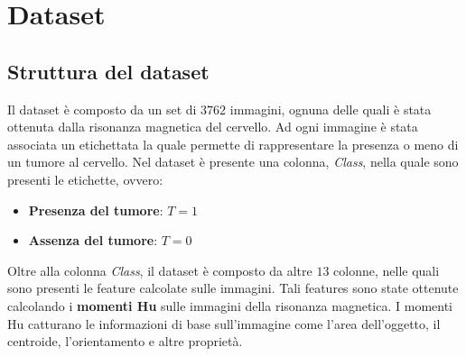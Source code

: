\chapter{Dataset}
\section{Struttura del dataset}
Il dataset è composto da un set di $3762$ immagini, ognuna delle quali è stata
ottenuta dalla risonanza magnetica del cervello. Ad ogni immagine è stata
associata un etichettata la quale permette di rappresentare la presenza o meno
di un tumore al cervello. Nel dataset è presente una colonna, \textit{Class},
nella quale sono presenti le etichette, ovvero:
\begin{itemize}
      \item \textbf{Presenza del tumore}: $T = 1$
      \item \textbf{Assenza del tumore}: $T = 0$
\end{itemize}

Oltre alla colonna \textit{Class}, il dataset è composto da altre $13$ colonne,
nelle quali sono presenti le feature calcolate sulle immagini. Tali features sono state
ottenute calcolando i \textbf{momenti Hu} sulle immagini della risonanza magnetica.
I momenti Hu catturano le informazioni di base sull'immagine come l'area
dell'oggetto, il centroide, l'orientamento e altre proprietà.


